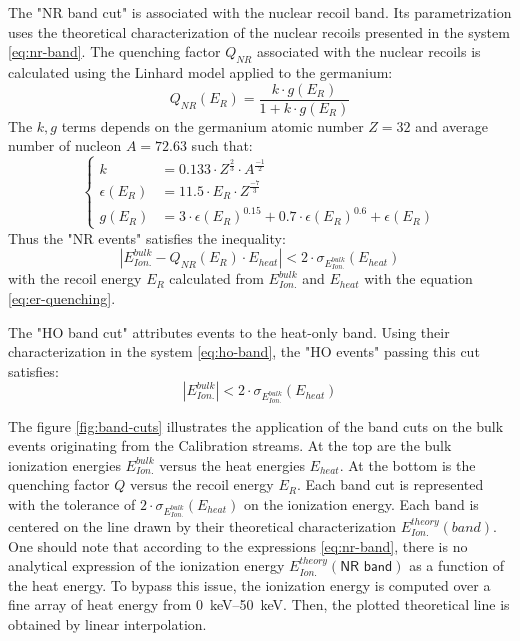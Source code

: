 The "NR band cut" is associated with the nuclear recoil band. Its parametrization uses the theoretical characterization of the nuclear recoils presented in the system \ref{eq:nr-band}. The quenching factor $Q_{NR}$ associated with the nuclear recoils  is calculated using the Linhard model applied to the germanium:
\begin{equation}
\label{eq:lindhard}
Q_{NR}(E_R) = \frac{k \cdot g(E_R)}{1+k \cdot g(E_R)}
\end{equation}
The $k,g$ terms depends on the germanium atomic number $Z=32$ and average number of nucleon $A=72.63$ such that:
\begin{equation}
\begin{cases}
k &= 0.133 \cdot Z^\frac{2}{3} \cdot A^\frac{-1}{2}
\\
\epsilon(E_R) &= 11.5 \cdot E_R \cdot Z^\frac{-7}{3}
\\
g(E_R) &= 3 \cdot \epsilon(E_R)^{0.15} + 0.7 \cdot\epsilon(E_R)^{0.6} + \epsilon(E_R) 
\end{cases}
\end{equation}
Thus the "NR events" satisfies the inequality:
\begin{equation}
\label{eq:condition-NR-ecei}
|E_{Ion.}^{bulk} - Q_{NR} \left( E_{R} \right) \cdot E_{heat}| < 2 \cdot \sigma_{E_{Ion.}^{bulk}} \left( E_{heat}\right)
\end{equation}
with the recoil energy $E_R$ calculated from $E_{Ion.}^{bulk}$ and $E_{heat}$ with the equation \ref{eq:er-quenching}.

The "HO band cut" attributes events to the heat-only band. Using their characterization in the system \ref{eq:ho-band}, the "HO events" passing this cut satisfies:
\begin{equation}
|E_{Ion.}^{bulk}| < 2 \cdot \sigma_{E_{Ion.}^{bulk}} \left( E_{heat}\right)
\end{equation}

The figure \ref{fig:band-cuts} illustrates the application of the band cuts on the bulk events originating from the Calibration streams. At the top are the bulk ionization energies $E_{Ion.}^{bulk}$ versus the heat energies $E_{heat}$. At the bottom is the quenching factor $Q$ versus the recoil energy $E_R$. Each band cut is represented with the tolerance of $2 \cdot \sigma_{E_{Ion.}^{bulk}} \left( E_{heat}\right)$ on the ionization  energy. Each band is centered on the line drawn by their theoretical characterization $E_{Ion.}^{theory}(band)$.
One should note that according to the expressions \ref{eq:nr-band}, there is no analytical expression of the ionization energy $E_{Ion.}^{theory}(\textsf{NR band})$ as a function of the heat energy. To bypass this issue, the ionization energy is computed over a fine array of heat energy from \SIrange{0}{50}{\kilo\eV}. Then, the plotted theoretical line is obtained by linear interpolation.

